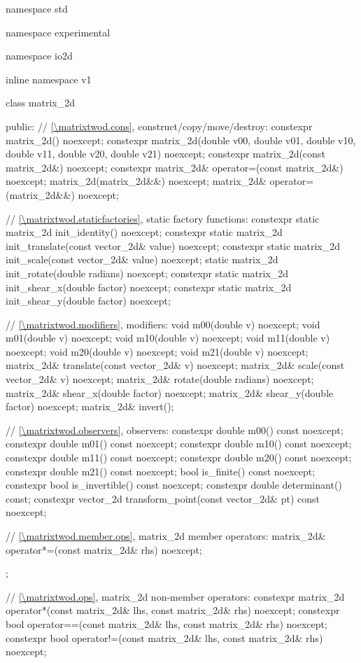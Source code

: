 \begin{codeblock}
namespace std { namespace experimental { namespace io2d { inline namespace v1 {
  class matrix_2d {
  public:
    // \ref{\matrixtwod.cons}, construct/copy/move/destroy:
    constexpr matrix_2d() noexcept;
    constexpr matrix_2d(double v00, double v01, double v10, double v11,
      double v20, double v21) noexcept;
    constexpr matrix_2d(const matrix_2d&) noexcept;
    constexpr matrix_2d& operator=(const matrix_2d&) noexcept;
    matrix_2d(matrix_2d&&) noexcept;
    matrix_2d& operator=(matrix_2d&&) noexcept;
    
    // \ref{\matrixtwod.staticfactories}, static factory functions:
    constexpr static matrix_2d init_identity() noexcept;
    constexpr static matrix_2d init_translate(const vector_2d& value) noexcept;
    constexpr static matrix_2d init_scale(const vector_2d& value) noexcept;
    static matrix_2d init_rotate(double radians) noexcept;
    constexpr static matrix_2d init_shear_x(double factor) noexcept;
    constexpr static matrix_2d init_shear_y(double factor) noexcept;
    
    // \ref{\matrixtwod.modifiers}, modifiers:
    void m00(double v) noexcept;
    void m01(double v) noexcept;
    void m10(double v) noexcept;
    void m11(double v) noexcept;
    void m20(double v) noexcept;
    void m21(double v) noexcept;
    matrix_2d& translate(const vector_2d& v) noexcept;
    matrix_2d& scale(const vector_2d& v) noexcept;
    matrix_2d& rotate(double radians) noexcept;
    matrix_2d& shear_x(double factor) noexcept;
    matrix_2d& shear_y(double factor) noexcept;
    matrix_2d& invert();
    
    // \ref{\matrixtwod.observers}, observers:
    constexpr double m00() const noexcept;
    constexpr double m01() const noexcept;
    constexpr double m10() const noexcept;
    constexpr double m11() const noexcept;
    constexpr double m20() const noexcept;
    constexpr double m21() const noexcept;
    bool is_finite() const noexcept;
    constexpr bool is_invertible() const noexcept;
    constexpr double determinant() const;
    constexpr vector_2d transform_point(const vector_2d& pt) const noexcept;
    
    // \ref{\matrixtwod.member.ops}, matrix_2d member operators:
    matrix_2d& operator*=(const matrix_2d& rhs) noexcept;
  };
    
  // \ref{\matrixtwod.ops}, matrix_2d non-member operators:
  constexpr matrix_2d operator*(const matrix_2d& lhs, const matrix_2d& rhs)
    noexcept;
  constexpr bool operator==(const matrix_2d& lhs, const matrix_2d& rhs)
    noexcept;
  constexpr bool operator!=(const matrix_2d& lhs, const matrix_2d& rhs)
    noexcept;
} } } }
\end{codeblock}

